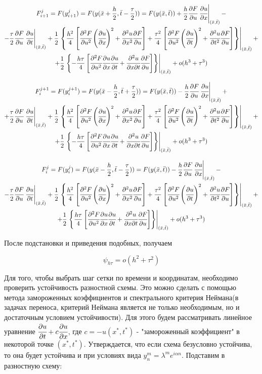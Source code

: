 \documentclass[12pt]{article}
\def\dd#1#2{\cfrac{\partial#1}{\partial#2}}
\def\ddd#1#2#3{\cfrac{\partial^2#1}{\partial#2\partial#3}}
\def\dddd#1#2{\cfrac{\partial^2#1}{\partial{#2}^2}}
\def \atxt#1{\left.#1\right|_{(\bar{x},\bar{t})}}
\begin{document}
		\begin{multline}
			F^{j}_{i+1} = F(y^{j}_{i+1}) = F(y(\bar{x} + \frac{h}{2}, \bar{t} - \frac{\tau}{2})) =  F(y(\bar{x}, \bar{t})) + \frac{h}{2}\dd{F}u\atxt{\dd{u}x} - \\
			-\frac{\tau}{2}\dd{F}u\atxt{\dd{u}t} + \frac{1}{2}\atxt{\left\{ \frac{h^2}{4}\left[ \dddd{F}u \left( \dd{u}x\right)^2 + \dddd{u}x\dd{F}u \right] + \frac{\tau^2}{4}\left[ \dddd{F}u\left( \dd{u}t \right)^2 + \dddd{u}t\dd{F}u \right] \right\}}+\\
			+ \frac{1}{2}\atxt{\left\{ -\frac{h\tau}{4}\left[ \dddd{F}u\dd{u}x\dd{u}t + \ddd{u}{x}t\dd{F}u \right] \right\}} + o(h^3 + \tau^3)
		\end{multline}

		\begin{multline}
			F^{j+1}_{i} = F(y^{j+1}_{i}) = F(y(\bar{x} - \frac{h}{2}, \bar{t} + \frac{\tau}{2})) =  F(y(\bar{x}, \bar{t})) - \frac{h}{2}\dd{F}u\atxt{\dd{u}x} + \\
			+\frac{\tau}{2}\dd{F}u\atxt{\dd{u}t} + \frac{1}{2}\atxt{\left\{ \frac{h^2}{4}\left[ \dddd{F}u \left( \dd{u}x\right)^2 + \dddd{u}x\dd{F}u \right] + \frac{\tau^2}{4}\left[ \dddd{F}u\left( \dd{u}t \right)^2 + \dddd{u}t\dd{F}u \right] \right\}}+\\
			+ \frac{1}{2}\atxt{\left\{ -\frac{h\tau}{4}\left[ \dddd{F}u\dd{u}x\dd{u}t + \ddd{u}{x}t\dd{F}u \right] \right\}} + o(h^3 + \tau^3)
		\end{multline}
		
		\begin{multline}
			F^{j}_{i} = F(y^{j}_{i}) = F(y(\bar{x} - \frac{h}{2}, \bar{t} - \frac{\tau}{2})) =  F(y(\bar{x}, \bar{t})) - \frac{h}{2}\dd{F}u\atxt{\dd{u}x} - \\
			-\frac{\tau}{2}\dd{F}u\atxt{\dd{u}t} + \frac{1}{2}\atxt{\left\{ \frac{h^2}{4}\left[ \dddd{F}u \left( \dd{u}x\right)^2 + \dddd{u}x\dd{F}u \right] + \frac{\tau^2}{4}\left[ \dddd{F}u\left( \dd{u}t \right)^2 + \dddd{u}t\dd{F}u \right] \right\}}+\\
			+ \frac{1}{2}\atxt{\left\{ \frac{h\tau}{4}\left[ \dddd{F}u\dd{u}x\dd{u}t + \ddd{u}{x}t\dd{F}u \right] \right\}} + o(h^3 + \tau^3)
		\end{multline}
		
		После подстановки и приведения подобных, получаем
		
		$$\psi_{h\tau} = o(h^2+\tau^2)$$
		
		Для того, чтобы выбрать шаг сетки по времени и координатам, необходимо проверить устойчивость разностной схемы. Это можно сделать с помощью метода замороженных коэффициентов и спектрального критерия Неймана(в задачах переноса, критерий Неймана является не только необходимым, но и достаточным условием устойчивости). Для этого будем рассматривать линейное уравнение $\dd{u}t + c\dd{u}x$, где $c = -u(x^*,t^*)$ - "замороженный коэффициент" в некоторой точке $(x^*,t^*)$. Утверждается, что если схема безусловно устойчива, то она будет устойчива и при условиях вида $y^m_n = \lambda^m e^{i\alpha n}$. Подставим в разностную схему:
		
\end{document}
